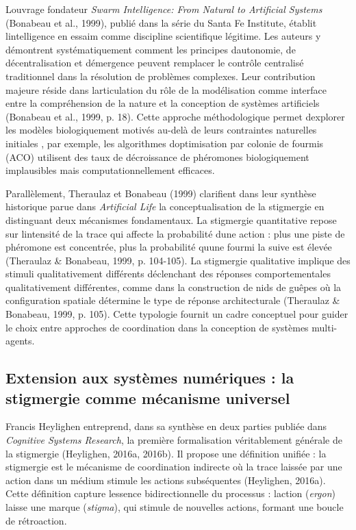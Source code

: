 \documentclass[12pt,a4paper]{article}
\begin{document}
L\textquotesingle ouvrage fondateur \emph{Swarm Intelligence: From
Natural to Artificial Systems} (Bonabeau et al., 1999), publié dans la
série du Santa Fe Institute, établit l\textquotesingle intelligence en
essaim comme discipline scientifique légitime. Les auteurs y démontrent
systématiquement comment les principes d\textquotesingle autonomie, de
décentralisation et d\textquotesingle émergence peuvent remplacer le
contrôle centralisé traditionnel dans la résolution de problèmes
complexes. Leur contribution majeure réside dans
l\textquotesingle articulation du rôle de la modélisation comme
interface entre la compréhension de la nature et la conception de
systèmes artificiels (Bonabeau et al., 1999, p. 18). Cette approche
méthodologique permet d\textquotesingle explorer les modèles
biologiquement motivés au-delà de leurs contraintes naturelles initiales
, par exemple, les algorithmes d\textquotesingle optimisation par
colonie de fourmis (ACO) utilisent des taux de décroissance de
phéromones biologiquement implausibles mais computationnellement
efficaces.

Parallèlement, Theraulaz et Bonabeau (1999) clarifient dans leur
synthèse historique parue dans \emph{Artificial Life} la
conceptualisation de la stigmergie en distinguant deux mécanismes
fondamentaux. La stigmergie quantitative repose sur
l\textquotesingle intensité de la trace qui affecte la probabilité
d\textquotesingle une action : plus une piste de phéromone est
concentrée, plus la probabilité qu\textquotesingle une fourmi la suive
est élevée (Theraulaz \& Bonabeau, 1999, p. 104-105). La stigmergie
qualitative implique des stimuli qualitativement différents déclenchant
des réponses comportementales qualitativement différentes, comme dans la
construction de nids de guêpes où la configuration spatiale détermine le
type de réponse architecturale (Theraulaz \& Bonabeau, 1999, p. 105).
Cette typologie fournit un cadre conceptuel pour guider le choix entre
approches de coordination dans la conception de systèmes multi-agents.

\subsection{Extension aux systèmes numériques : la stigmergie comme
mécanisme
universel}\label{extension-aux-systuxe8mes-numuxe9riques--la-stigmergie-comme-muxe9canisme-universel}

Francis Heylighen entreprend, dans sa synthèse en deux parties publiée
dans \emph{Cognitive Systems Research}, la première formalisation
véritablement générale de la stigmergie (Heylighen, 2016a, 2016b). Il
propose une définition unifiée : la stigmergie est le mécanisme de
coordination indirecte où la trace laissée par une action dans un médium
stimule les actions subséquentes (Heylighen, 2016a). Cette définition
capture l\textquotesingle essence bidirectionnelle du processus :
l\textquotesingle action (\emph{ergon}) laisse une marque
(\emph{stigma}), qui stimule de nouvelles actions, formant une boucle de
rétroaction.
\end{document}
